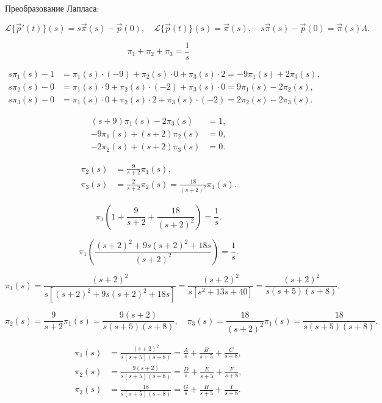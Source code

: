 Преобразование Лапласа:

\[
	\mathcal{L}\{\vec p'(t)\}(s)=s \vec \pi(s)-\vec p(0)
	,\quad
	\mathcal{L}\{\vec p(t)\}(s)=\vec \pi(s)
	,\quad
	s \vec \pi(s)-\vec p(0)=\vec \pi(s)\Lambda.
\]

\[
	\pi_1+\pi_2+\pi_3=\frac{1}{s}
\]

\[
	\begin{aligned}
		s \pi_1(s)-1 & = \pi_1(s)\cdot(-9) + \pi_2(s)\cdot 0 + \pi_3(s)\cdot 2 = -9\pi_1(s)+2\pi_3(s), \\
		s \pi_2(s)-0 & = \pi_1(s)\cdot 9 + \pi_2(s)\cdot(-2) + \pi_3(s)\cdot 0 = 9\pi_1(s)-2\pi_2(s),  \\
		s \pi_3(s)-0 & = \pi_1(s)\cdot 0 + \pi_2(s)\cdot 2 + \pi_3(s)\cdot(-2) = 2\pi_2(s)-2\pi_3(s).
	\end{aligned}
\]

\[
	\begin{aligned}
		(s+9)\pi_1(s)-2\pi_3(s)  & = 1, \\
		-9\pi_1(s)+(s+2)\pi_2(s) & = 0, \\
		-2\pi_2(s)+(s+2)\pi_3(s) & = 0.
	\end{aligned}
\]

\[
	\begin{aligned}
		\pi_2(s) & = \frac{9}{s+2}\pi_1(s),                              \\
		\pi_3(s) & = \frac{2}{s+2}\pi_2(s) = \frac{18}{(s+2)^2}\pi_1(s).
	\end{aligned}
\]

\[
	\pi_1(1+ \frac{9}{s+2} + \frac{18}{(s+2)^2}) = \frac{1}{s}.
\]

\[
	\pi_1\left(\frac{(s+2)^2+9s(s+2)^2+ 18s}{(s+2)^2}\right) = \frac{1}{s}.
\]

\[
	\pi_1(s) = \frac{(s+2)^2}{s[(s+2)^2+9s(s+2)^2+ 18s]}
	= \frac{(s+2)^2}{s[s^2+13s+40]}
	= \frac{(s+2)^2}{s(s+5)(s+8)}.
\]

\[
	\pi_2(s) = \frac{9}{s+2}\pi_1(s) = \frac{9(s+2)}{s(s+5)(s+8)},
	\quad
	\pi_3(s) = \frac{18}{(s+2)^2}\pi_1(s) = \frac{18}{s(s+5)(s+8)}.
\]

\[
	\begin{aligned}
		\pi_1(s) & = \frac{(s+2)^2}{s(s+5)(s+8)} = \frac{A}{s} + \frac{B}{s+5} + \frac{C}{s+8}, \\
		\pi_2(s) & = \frac{9(s+2)}{s(s+5)(s+8)} = \frac{D}{s} + \frac{E}{s+5} + \frac{F}{s+8},  \\
		\pi_3(s) & = \frac{18}{s(s+5)(s+8)} = \frac{G}{s} + \frac{H}{s+5} + \frac{I}{s+8}.
	\end{aligned}
\]

